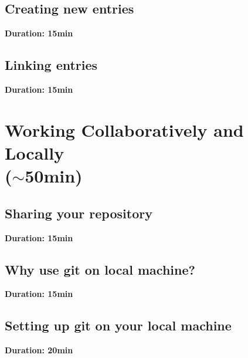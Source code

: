 \documentclass[a4paper, 12pt, oneside]{report} %
\begin{document}
\section{Creating new entries}
\label{sec:creating_new_entries}

{\bfseries Duration: 15min}




\section{Linking entries}
\label{sec:linking_entries}

{\bfseries Duration: 15min}





\chapter{Working Collaboratively and Locally\\($\sim$50min)}
\label{cha:working_collaboratively_and_locally}

\section{Sharing your repository}
\label{sec:sharing_your_repository}

{\bfseries Duration: 15min}




\section{Why use git on local machine?}
\label{sec:why_use_git_on_local_machine}

{\bfseries Duration: 15min}






\section{Setting up git on your local machine}
\label{sec:setting_up_git_on_your_local_machine}

{\bfseries Duration: 20min}
\end{document}

